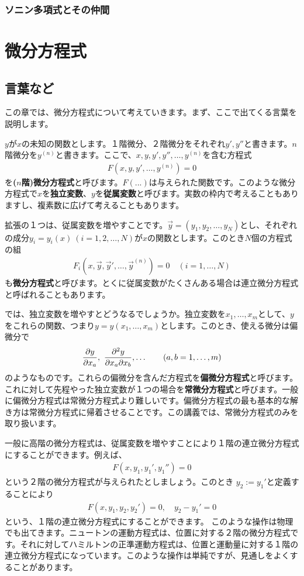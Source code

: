 \documentclass[report,paper=a4, fontsize=12pt, line_length=16cm, number_of_lines=33,dvipdfmx]{jlreq}
\numberwithin{equation}{section}
\newcommand{\strong}[1]{\textsf{\bfseries #1}}
\newcommand{\yv}{\vec{y}}
\begin{document}
\subsection{ソニン多項式とその仲間}



\chapter{微分方程式}\label{sec:ode}
\section{言葉など}
この章では、微分方程式について考えていきます。まず、ここで出てくる言葉を説明します。

$y$が$x$の未知の関数とします。１階微分、２階微分をそれぞれ$y',y''$と書きます。$n$階微分を$y^{(n)}$と書きます。ここで、$x,y,y',y'',\dots,y^{(n)}$を含む方程式
\begin{align}
  F(x,y,y',\dots,y^{(n)})=0
\end{align}
を\strong{($n$階)微分方程式}と呼びます。$F(...)$は与えられた関数です。このような微分方程式で$x$を\strong{独立変数}、$y$を\strong{従属変数}と呼びます。実数の枠内で考えることもありますし、複素数に広げて考えることもあります。

拡張の１つは、従属変数を増やすことです。$\yv=(y_1,y_2,\dots,y_N)$とし、それぞれの成分$y_i=y_i(x)\ (i=1,2,\dots,N)$が$x$の関数とします。このとき$N$個の方程式の組
\begin{align}
  F_i(x,\yv,\yv',\dots,\yv^{(n)})=0\quad (i=1,\dots,N)
\end{align}
も\strong{微分方程式}と呼びます。とくに従属変数がたくさんある場合は連立微分方程式と呼ばれることもあります。

では、独立変数を増やすとどうなるでしょうか。独立変数を$x_1,\dots,x_m$として、$y$をこれらの関数、つまり$y=y(x_1,\dots,x_m)$とします。このとき、使える微分は偏微分で
\begin{align}
  \pdv{y}{x_a},\ \pdv{y}{x_a}{x_b},\dots\qquad (a,b=1,\dots,m)
\end{align}
のようなものです。これらの偏微分を含んだ方程式を\strong{偏微分方程式}と呼びます。これに対して先程やった独立変数が１つの場合を\strong{常微分方程式}と呼びます。一般に偏微分方程式は常微分方程式より難しいです。偏微分方程式の最も基本的な解き方は常微分方程式に帰着させることです。この講義では、常微分方程式のみを取り扱います。

一般に高階の微分方程式は、従属変数を増やすことにより１階の連立微分方程式にすることができます。例えば、
\begin{align}
  F(x,y_1,y_1',y_1'')=0
\end{align}
という２階の微分方程式が与えられたとしましょう。このとき
$y_2:=y_1'$と定義することにより
\begin{align}
  F(x,y_1,y_2,y_2')=0,\quad y_2-y_1'=0
\end{align}
という、１階の連立微分方程式にすることができます。
このような操作は物理でも出てきます。ニュートンの運動方程式は、位置に対する２階の微分方程式です。それに対してハミルトンの正準運動方程式は、位置と運動量に対する１階の連立微分方程式になっています。このような操作は単純ですが、見通しをよくすることがあります。
\end{document}
